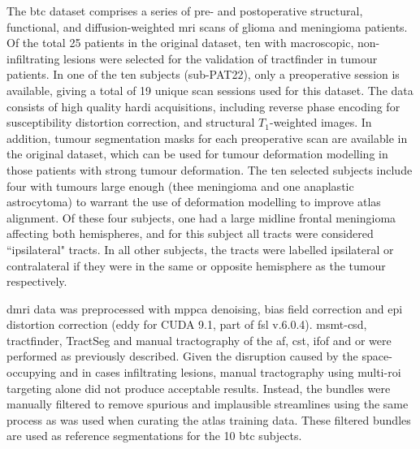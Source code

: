 The \gls{btc} dataset\autocite{Aerts2020a,Aerts2022a,Aerts2022} comprises a series of pre- and postoperative structural, functional, and diffusion-weighted \gls{mri} scans of glioma and meningioma patients.
Of the total 25 patients in the original dataset, ten with macroscopic, non-infiltrating lesions were selected for the validation of tractfinder in tumour patients.
In one of the ten subjects (sub-PAT22), only a preoperative session is available, giving a total of 19 unique scan sessions used for this dataset.
The data consists of high quality \gls{hardi} acquisitions, including reverse phase encoding for susceptibility distortion correction, and structural $T_1$-weighted images.
In addition, tumour segmentation masks for each preoperative scan are available in the original dataset, which can be used for tumour deformation modelling in those patients with strong tumour deformation.
The ten selected subjects include four with tumours large enough (thee meningioma and one anaplastic astrocytoma) to warrant the use of deformation modelling to improve atlas alignment.
Of these four subjects, one had a large midline frontal meningioma affecting both hemispheres, and for this subject all tracts were considered ``ipsilateral" tracts.
In all other subjects, the tracts were labelled ipsilateral or contralateral if they were in the same or opposite hemisphere as the tumour respectively.

\Gls{dmri} data was preprocessed with \gls{mppca} denoising, bias field correction and \gls{epi} distortion correction (eddy for CUDA 9.1, part of \gls{fsl} v.6.0.4).
\Gls{msmt}-\gls{csd}, tractfinder, TractSeg and manual tractography of the \gls{af}, \gls{cst}, \gls{ifof} and \gls{or} were performed as previously described.
Given the disruption caused by the space-occupying and in cases infiltrating lesions, manual tractography using multi-\gls{roi} targeting alone did not produce acceptable results.
Instead, the bundles were manually filtered to remove spurious and implausible streamlines using the same process as was used when curating the atlas training data.
These filtered bundles are used as reference segmentations for the 10 \gls{btc} subjects.


